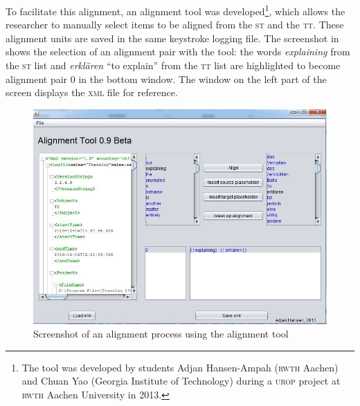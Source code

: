 \documentclass[output=paper]{LSP/langsci}
\begin{document}
To facilitate this alignment, an alignment tool was developed\footnote{The tool was developed by students Adjan Hansen-Ampah (\textsc{rwth} Aachen) and Chuan Yao (Georgia Institute of Technology) during a \textsc{urop} project at \textsc{rwth} Aachen University in 2013.}, which allows the researcher to manually select items to be aligned from the \textsc{st} and the \textsc{tt}. These alignment units are saved in the same keystroke logging file. The screenshot in  shows the selection of an alignment pair with the tool: the words \textit{explaining }from the \textsc{st} list and \textit{erklären} “to explain” from the \textsc{tt} list are highlighted to become alignment pair 0 in the bottom window. The window on the left part of the screen displays the \textsc{xml} file for reference.


\begin{figure}
\includegraphics[width=.7\textwidth]{./figures/2-1.jpg}
\caption{Screenshot of an alignment process using the alignment tool} \label{fig:1:1}
\end{figure}
\end{document}
